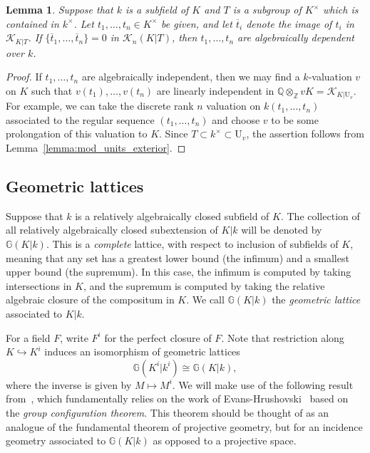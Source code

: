 \documentclass[12pt]{amsart}
\newcommand{\Zbb}{\mathbb{Z}}
\newcommand{\Qbb}{\mathbb{Q}}
\newcommand{\Gbb}{\mathbb{G}}
\newcommand{\Urm}{\mathrm{U}}
\newcommand{\Kcal}{\mathcal{K}}
\renewcommand{\bar}{\overline}
\newtheorem{lemma}[theorem]{Lemma}
\theoremstyle{definition}
\begin{document}
\begin{lemma}\label{lemma:detect_independence}
  Suppose that $k$ is a subfield of $K$ and $T$ is a subgroup of $K^{\times}$ which is contained in $k^{\times}$.
  Let $t_{1},\ldots,t_{n} \in K^{\times}$ be given, and let $\bar t_{i}$ denote the image of $t_{i}$ in $\Kcal_{K|T}$.
  If $\{\bar t_{1},\ldots,\bar t_{n}\} = 0$ in $\Kcal_{n}(K|T)$, then $t_{1},\ldots,t_{n}$ are algebraically dependent over $k$.
\end{lemma}
\begin{proof}
  If $t_{1},\ldots,t_{n}$ are algebraically independent, then we may find a $k$-valuation $v$ on $K$ such that $v(t_{1}),\ldots,v(t_{n})$ are linearly independent in $\Qbb \otimes_{\Zbb} vK = \Kcal_{K|\Urm_{v}}$.
  For example, we can take the discrete rank $n$ valuation on $k(t_{1},\ldots,t_{n})$ associated to the regular sequence $(t_{1},\ldots,t_{n})$ and choose $v$ to be some prolongation of this valuation to $K$.
  Since $T \subset k^{\times} \subset \Urm_{v}$, the assertion follows from Lemma~\ref{lemma:mod_units_exterior}.
\end{proof}

\subsection{Geometric lattices}

Suppose that $k$ is a relatively algebraically closed subfield of $K$.
The collection of all relatively algebraically closed subextension of $K|k$ will be denoted by $\Gbb(K|k)$.
This is a \emph{complete} lattice, with respect to inclusion of subfields of $K$, meaning that any set has a greatest lower bound (the infimum) and a smallest upper bound (the supremum).
In this case, the infimum is computed by taking intersections in $K$, and the supremum is computed by taking the relative algebraic closure of the compositum in $K$.
We call $\Gbb(K|k)$ the \emph{geometric lattice} associated to $K|k$.

For a field $F$, write $F^{i}$ for the perfect closure of $F$.
Note that restriction along $K \hookrightarrow K^{i}$ induces an isomorphism of geometric lattices
\[ \Gbb(K^{i}|k^{i}) \cong \Gbb(K|k), \]
where the inverse is given by $M \mapsto M^{i}$.
We will make use of the following result from~\cite{zbMATH05350217}, which fundamentally relies on the work of Evans-Hrushovski~\cite{zbMATH00007333,zbMATH00839199} based on the \emph{group configuration theorem}.
This theorem should be thought of as an analogue of the fundamental theorem of projective geometry, but for an incidence geometry associated to $\Gbb(K|k)$ as opposed to a projective space.
\end{document}
